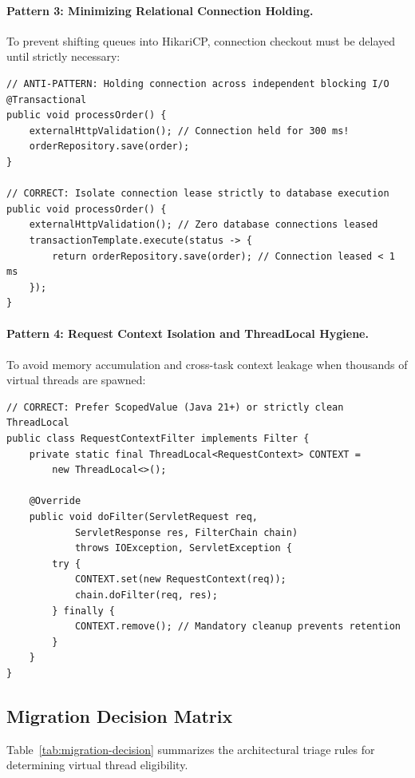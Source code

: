 \paragraph{Pattern 3: Minimizing Relational Connection Holding.}
To prevent shifting queues into HikariCP, connection checkout must be delayed until strictly necessary:
\begin{verbatim}
// ANTI-PATTERN: Holding connection across independent blocking I/O
@Transactional
public void processOrder() {
    externalHttpValidation(); // Connection held for 300 ms!
    orderRepository.save(order);
}

// CORRECT: Isolate connection lease strictly to database execution
public void processOrder() {
    externalHttpValidation(); // Zero database connections leased
    transactionTemplate.execute(status -> {
        return orderRepository.save(order); // Connection leased < 1 ms
    });
}
\end{verbatim}

\paragraph{Pattern 4: Request Context Isolation and ThreadLocal Hygiene.}
To avoid memory accumulation and cross-task context leakage when thousands of virtual threads are spawned:
\begin{verbatim}
// CORRECT: Prefer ScopedValue (Java 21+) or strictly clean ThreadLocal
public class RequestContextFilter implements Filter {
    private static final ThreadLocal<RequestContext> CONTEXT =
        new ThreadLocal<>();

    @Override
    public void doFilter(ServletRequest req,
            ServletResponse res, FilterChain chain)
            throws IOException, ServletException {
        try {
            CONTEXT.set(new RequestContext(req));
            chain.doFilter(req, res);
        } finally {
            CONTEXT.remove(); // Mandatory cleanup prevents retention
        }
    }
}
\end{verbatim}

\subsection{Migration Decision Matrix}
Table~\ref{tab:migration-decision} summarizes the architectural triage rules for determining virtual thread eligibility.

